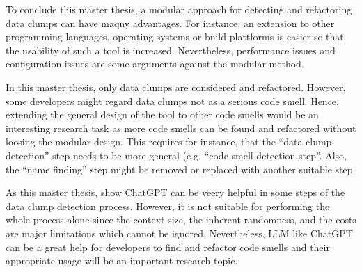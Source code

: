 To conclude this master thesis, a modular approach for detecting and refactoring data clumps can have maqny advantages.  For instance, an extension to other programming languages, operating systems or build plattforms is easier so that the usability of such a tool is increased. Nevertheless, performance issues and configuration issues are some arguments against the modular method. 

In this master thesis, only data clumps are considered and refactored. However, some developers might regard data clumps not as a serious code smell. Hence, extending the general design of the tool to other code smells would be an interesting research task as more code smells can be found and refactored without loosing the modular design. This requires for instance, that the \enquote{data clump detection} step needs to be more general (e.g. \enquote{code smell detection step}. Also, the \enquote{name finding} step might be removed or replaced with another suitable step. 

As this master thesis, show ChatGPT can be veery helpful in some steps of the data clump detection process. However, it is not suitable for performing the whole process alone since the context size, the inherent randomness, and the costs are major limitations which cannot be ignored. Nevertheless, \ac{LLM} like ChatGPT can be a great help for developers to find and refactor code smells and their appropriate usage will be an important research topic. 

